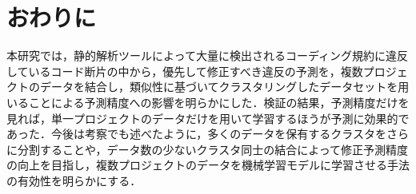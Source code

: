 \documentclass[T,J]{fose} %
\begin{document}
\section{おわりに}\label{sec:end}
本研究では，静的解析ツールによって大量に検出されるコーディング規約に違反しているコード断片の中から，優先して修正すべき違反の予測を，複数プロジェクトのデータを結合し，類似性に基づいてクラスタリングしたデータセットを用いることによる予測精度への影響を明らかにした．検証の結果，予測精度だけを見れば，単一プロジェクトのデータだけを用いて学習するほうが予測に効果的であった．今後は考察でも述べたように，多くのデータを保有するクラスタをさらに分割することや，データ数の少ないクラスタ同士の結合によって修正予測精度の向上を目指し，複数プロジェクトのデータを機械学習モデルに学習させる手法の有効性を明らかにする．






\end{document}
